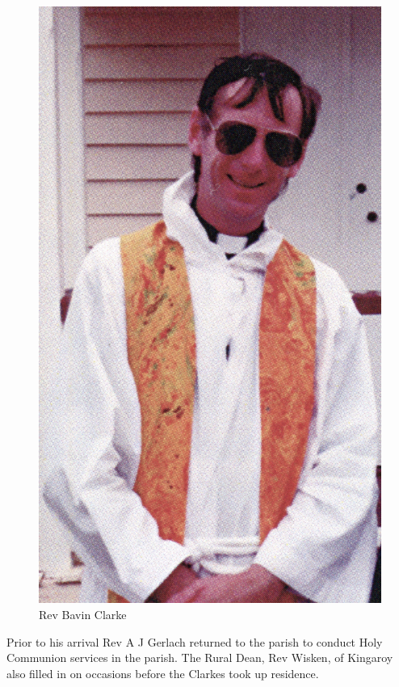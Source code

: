 \begin{figure}
\begin{center}
\includegraphics[width=1.\linewidth,center]{../images/bavin.jpg}
\caption{Rev Bavin Clarke}
\end{center}
\end{figure}




Prior to his arrival Rev A J Gerlach returned to the parish to conduct Holy Communion services in the parish. The Rural Dean, Rev Wisken, of Kingaroy also filled in on occasions before the Clarkes took up residence.



